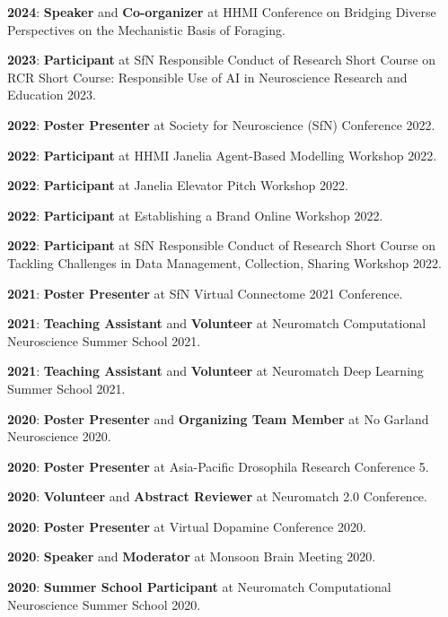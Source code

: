 \documentclass[letterpaper,9pt]{article}
\newcommand{\resumeItem}[2]{
  \item\small{
    \textbf{#1}{: #2 \vspace{-2pt}}
  }
}
\newcommand{\resumeSubItem}[2]{\resumeItem{#1}{#2}\vspace{-4pt}}
\begin{document}
    \resumeSubItem{2024}
      {\textbf{Speaker} and \textbf{Co-organizer} at HHMI Conference on Bridging Diverse Perspectives on the Mechanistic Basis of Foraging.}
    
    \resumeSubItem{2023}
      {\textbf{Participant} at SfN Responsible Conduct of Research Short Course on RCR Short Course: Responsible Use of AI in Neuroscience Research and Education 2023.}
    
    \resumeSubItem{2022}
      {\textbf{Poster Presenter} at Society for Neuroscience (SfN) Conference 2022.}
    
    \resumeSubItem{2022}
      {\textbf{Participant} at HHMI Janelia Agent-Based Modelling Workshop 2022.}
    
    \resumeSubItem{2022}
      {\textbf{Participant} at Janelia Elevator Pitch Workshop 2022.}
    
    \resumeSubItem{2022}
      {\textbf{Participant} at Establishing a Brand Online Workshop 2022.}
    
    \resumeSubItem{2022}
      {\textbf{Participant} at SfN Responsible Conduct of Research Short Course on Tackling Challenges in Data Management, Collection, Sharing Workshop 2022.}
    
    \resumeSubItem{2021}
      {\textbf{Poster Presenter} at SfN Virtual Connectome 2021 Conference.}
    
    \resumeSubItem{2021}
      {\textbf{Teaching Assistant} and \textbf{Volunteer} at Neuromatch Computational Neuroscience Summer School 2021.}
    
    \resumeSubItem{2021}
      {\textbf{Teaching Assistant} and \textbf{Volunteer} at Neuromatch Deep Learning Summer School 2021.}
    
    \resumeSubItem{2020}
      {\textbf{Poster Presenter} and \textbf{Organizing Team Member} at No Garland Neuroscience 2020.}
    
    \resumeSubItem{2020}
      {\textbf{Poster Presenter} at Asia-Pacific Drosophila Research Conference 5.}
    
    \resumeSubItem{2020}
      {\textbf{Volunteer} and \textbf{Abstract Reviewer} at Neuromatch 2.0 Conference.}
    
    \resumeSubItem{2020}
      {\textbf{Poster Presenter} at Virtual Dopamine Conference 2020.}
    
    \resumeSubItem{2020}
      {\textbf{Speaker} and \textbf{Moderator} at Monsoon Brain Meeting 2020.}
    
    \resumeSubItem{2020}
      {\textbf{Summer School Participant} at Neuromatch Computational Neuroscience Summer School 2020.}
    
\end{document}
